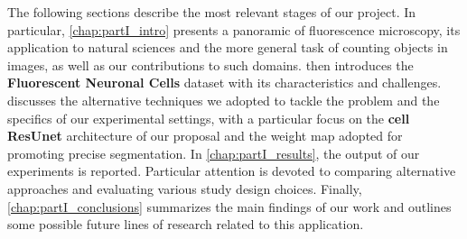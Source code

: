 The following sections describe the most relevant stages of our project.
In particular, \cref{chap:partI_intro} presents a panoramic of fluorescence microscopy, its application to natural sciences and the more general task of counting objects in images, as well as our contributions to such domains.
 then introduces the \textbf{Fluorescent Neuronal Cells} dataset with its characteristics and challenges.
 discusses the alternative techniques we adopted to tackle the problem and the specifics of our experimental settings, with a particular focus on the \textbf{cell ResUnet} architecture of our proposal and the weight map adopted for promoting precise segmentation.
In \cref{chap:partI_results}, the output of our experiments is reported. Particular attention is devoted to comparing alternative approaches and evaluating various study design choices.
Finally, \cref{chap:partI_conclusions} summarizes the main findings of our work and outlines some possible future lines of research related to this application.